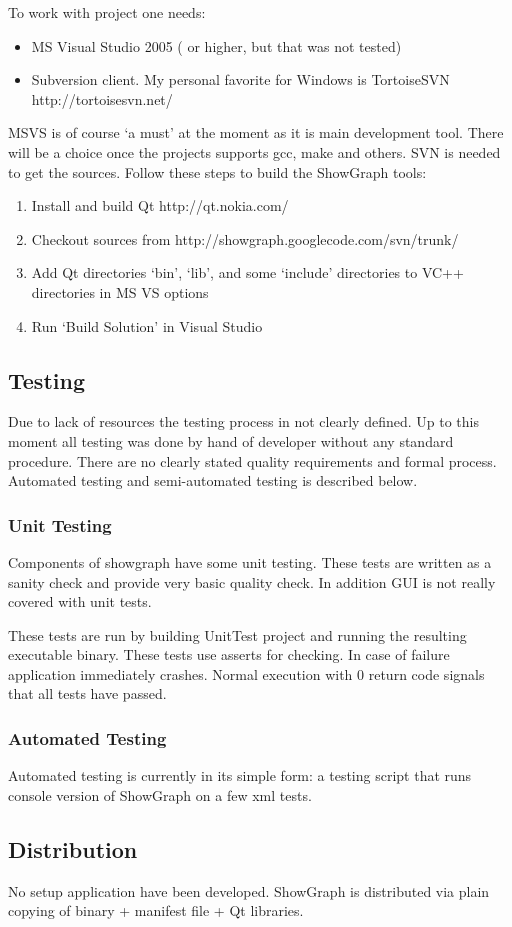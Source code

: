 \documentclass[11pt,twoside,a4paper]{article}
\begin{document}
To work with project one needs:
\begin{itemize}
\item MS Visual Studio 2005 ( or higher, but that was not tested)\
\item Subversion client. My personal favorite for Windows is TortoiseSVN http://tortoisesvn.net/
\end{itemize}

MSVS is of course `a must' at the moment as it is main development tool. There will be a choice once the projects supports gcc, make and others. SVN is needed to get the sources. Follow these steps to build the ShowGraph tools:
\begin{enumerate}
\item Install and build Qt http://qt.nokia.com/
\item Checkout sources from http://showgraph.googlecode.com/svn/trunk/
\item Add Qt directories `bin', `lib', and some `include' directories to VC++ directories in MS VS options
\item Run `Build Solution' in Visual Studio
\end{enumerate}

\subsection{Testing}
Due to lack of resources the testing process in not clearly defined. Up to this moment all testing was done by hand of developer without any standard procedure. There are no clearly stated quality requirements and formal process. Automated testing and semi-automated testing is described below.

\subsubsection{Unit Testing}
Components of showgraph have some unit testing. These tests are written as a sanity check and provide very basic quality check. In addition GUI is not really covered with unit tests.

These tests are run by building UnitTest project and running the resulting executable binary. These tests use asserts for checking. In case of failure application immediately crashes. Normal execution with 0 return code signals that all tests have passed.

\subsubsection{Automated Testing}
Automated testing is currently in its simple form: a testing script that runs console version of ShowGraph on a few xml tests.

\subsection{Distribution}
No setup application have been developed. ShowGraph is distributed via plain copying of binary + manifest file + Qt libraries.
\end{document}
